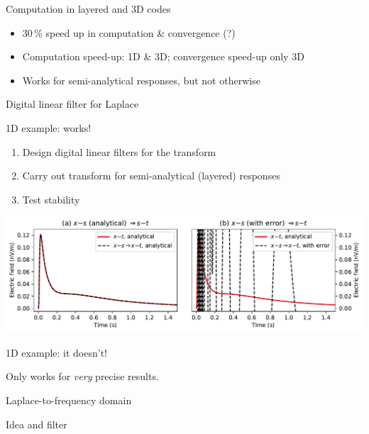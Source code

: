 \documentclass[xcolor=svgnames, usepdftitle=false, aspectratio=169]{beamer}
\begin{document}
\begin{frame}  %
  {Computation in layered and 3D codes}

  \begin{itemize}
    \item 30\,\% speed up in computation \& convergence (?)
    \item Computation speed-up: 1D \& 3D; convergence speed-up only 3D
    \item Works for semi-analytical responses, but not otherwise
  \end{itemize}
\end{frame}

\begin{frame}  %
  {Digital linear filter for Laplace}
\end{frame}


\begin{frame}
  {1D example: works!}

  \begin{enumerate}
    \item Design digital linear filters for the transform
    \item Carry out transform for semi-analytical (layered) responses
    \item Test stability
  \end{enumerate}


  \includegraphics[width=\linewidth]{s-t_time}%

\end{frame}

\begin{frame}
  {1D example: it doesn't!}

  Only works for \emph{very} precise results.

\end{frame}


\begin{frame}
  {Laplace-to-frequency domain}

  Idea and filter

\end{frame}
\end{document}
